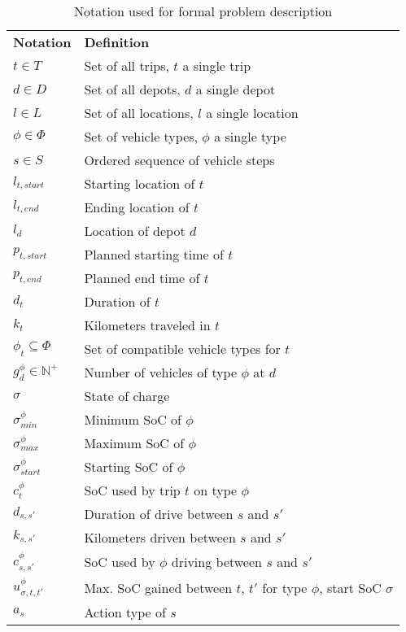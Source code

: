 \documentclass[]{article}
\begin{document}
\begin{table}
  \centering
  \begin{tabular}{ll}
    \toprule
    \multicolumn{1}{l}{\textbf{Notation}} & \multicolumn{1}{l}{\textbf{Definition}}               \\
    \cmidrule(lr){1-1}\cmidrule(lr){2-2}
    $t \in T$ & Set of all trips, $t$ a single trip \\
    $d \in D$ & Set of all depots, $d$ a single depot \\
    $l \in L$ & Set of all locations, $l$ a single location \\
    $\phi \in \Phi$ & Set of vehicle types, $\phi$ a single type \\
    $s \in S$ & Ordered sequence of vehicle steps \\ 
    $l_{t,start}$ & Starting location of $t$ \\
    $l_{t,end}$ & Ending location of $t$ \\ 
    $l_{d}$ & Location of depot $d$ \\
    $p_{t,start}$ & Planned starting time of $t$ \\
    $p_{t,end}$ & Planned end time of $t$ \\
    $d_t$ & Duration of $t$ \\ 
    $k_t$ & Kilometers traveled in $t$ \\
    $\phi_t \subseteq \Phi$ & Set of compatible vehicle types for $t$ \\
    $g^\phi_{d} \in \mathbb{N}^+$ & Number of vehicles of type $\phi$ at $d$ \\
    $\sigma$ & State of charge \\
    $\sigma^\phi_{min}$ & Minimum SoC of $\phi$ \\ 
    $\sigma^\phi_{max}$ & Maximum SoC of $\phi$ \\ 
    $\sigma^\phi_{start}$ & Starting SoC of $\phi$ \\ 
    $c^\phi_{t}$ & SoC used by trip $t$ on type $\phi$ \\
    $d_{s,s'}$ & Duration of drive between $s$ and $s'$ \\
    $k_{s,s'}$ & Kilometers driven between $s$ and $s'$ \\
    $c^\phi_{s,s'}$ & SoC used by $\phi$ driving between $s$ and $s'$ \\
    $u^\phi_{\sigma,t,t'}$ & Max. SoC gained between $t$, $t'$ for type $\phi$, start SoC $\sigma$ \\
    $a_s$ & Action type of $s$ \\
    \bottomrule
  \end{tabular}
  \label{tab:notation}
  \caption{Notation used for formal problem description}
\end{table}
\end{document}
